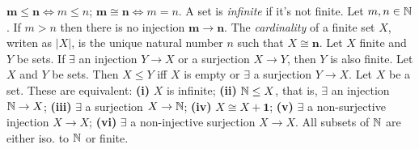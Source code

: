  $\mathbf{m} \leq \mathbf{n} \iff m \leq n$; $\mathbf{m} \cong \mathbf{n} \iff m = n$.
 A set is \textit{infinite} if it's not finite.
 Let $m, n \in \operatorname{\mathbb{N}}$. If $m > n$ then there is no injection $\mathbf{m} \to \mathbf{n}$.
 The \textit{cardinality} of a finite set $X$, writen as $|X|$, is the unique natural number $n$ such that $X \cong \mathbf{n}$.
 Let $X$ finite and $Y$ be sets. If $\exists$ an injection $Y \to X$ or a surjection $X \to Y$, then $Y$ is also finite.
 Let $X$ and $Y$ be sets. Then $X \leq Y$ iff $X$ is empty or $\exists$ a surjection $Y \to X$.
 Let $X$ be a set. These are equivalent: \textbf{(i)} $X$ is infinite; \textbf{(ii)} $\operatorname{\mathbb{N}} \leq X$, that is, $\exists$ an injection $\operatorname{\mathbb{N}} \to X$; \textbf{(iii)} $\exists$ a surjection $X \to \operatorname{\mathbb{N}}$; \textbf{(iv)} $X \cong X + \mathbf{1}$; \textbf{(v)} $\exists$ a non-surjective injection $X \to X$; \textbf{(vi)} $\exists$ a non-injective surjection $X \to X$.
 All subsets of $\operatorname{\mathbb{N}}$ are either iso. to $\operatorname{\mathbb{N}}$ or finite.

